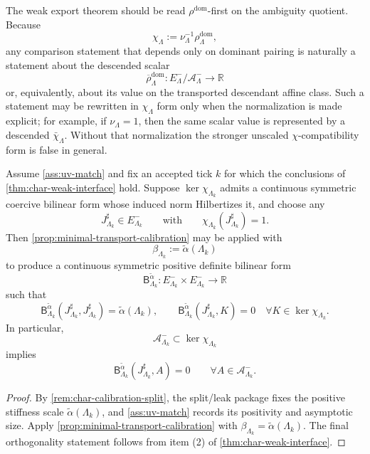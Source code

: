 \documentclass[11pt]{article}
\begin{document}
\begin{remark}
\label{rem:char-weak-interface-rho-first}
The weak export theorem should be read \(\rho^{\mathrm{dom}}\)-first on the ambiguity quotient.
Because
\[
\chi_{\Lambda}
:=
\nu_{\Lambda}^{-1}\rho^{\mathrm{dom}}_{\Lambda},
\]
any comparison statement that depends only on dominant pairing is naturally a statement about the
descended scalar
\[
\overline{\rho}^{\mathrm{dom}}_{\Lambda}
:
E^-_{\Lambda}/\mathcal A^-_{\Lambda}\to\mathbb R
\]
or, equivalently, about its value on the transported descendant affine class.
Such a statement may be rewritten in \(\chi_{\Lambda}\) form only when the normalization is made
explicit; for example, if \(\nu_{\Lambda}=1\), then the same scalar value is represented by a
descended \(\bar\chi_{\Lambda}\).
Without that normalization the stronger unscaled \(\chi\)-compatibility form is false in general.
\end{remark}

\begin{corollary}
\label{cor:char-weak-calibration}
Assume \cref{ass:uv-match} and fix an accepted tick \(k\) for which the conclusions of
\cref{thm:char-weak-interface} hold.
Suppose \(\ker\chi_{\Lambda_k}\) admits a continuous symmetric coercive bilinear form whose induced
norm Hilbertizes it, and choose any
\[
J^\sharp_{\Lambda_k}\in E^-_{\Lambda_k}
\qquad
\text{with}
\qquad
\chi_{\Lambda_k}(J^\sharp_{\Lambda_k})=1.
\]
Then \cref{prop:minimal-transport-calibration} may be applied with
\[
\beta_{\Lambda_k}:=\widetilde\alpha(\Lambda_k)
\]
to produce a continuous symmetric positive definite bilinear form
\[
\mathsf B^{\widetilde\alpha}_{\Lambda_k}
:
E^-_{\Lambda_k}\times E^-_{\Lambda_k}\to\mathbb R
\]
such that
\[
\mathsf B^{\widetilde\alpha}_{\Lambda_k}(J^\sharp_{\Lambda_k},J^\sharp_{\Lambda_k})
=
\widetilde\alpha(\Lambda_k),
\qquad
\mathsf B^{\widetilde\alpha}_{\Lambda_k}(J^\sharp_{\Lambda_k},K)=0
\quad
\forall K\in\ker\chi_{\Lambda_k}.
\]
In particular,
\[
\mathcal A^-_{\Lambda_k}\subset\ker\chi_{\Lambda_k}
\]
implies
\[
\mathsf B^{\widetilde\alpha}_{\Lambda_k}(J^\sharp_{\Lambda_k},A)=0
\qquad
\forall A\in\mathcal A^-_{\Lambda_k}.
\]
\end{corollary}

\begin{proof}
By \cref{rem:char-calibration-split}, the split/leak package fixes the positive stiffness scale
\(\widetilde\alpha(\Lambda_k)\), and \cref{ass:uv-match} records its positivity and asymptotic
size.
Apply \cref{prop:minimal-transport-calibration} with
\(\beta_{\Lambda_k}=\widetilde\alpha(\Lambda_k)\).
The final orthogonality statement follows from item (2) of \cref{thm:char-weak-interface}.
\end{proof}
\end{document}
